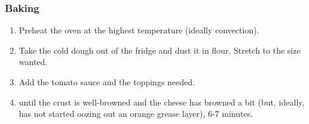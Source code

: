 \subsubsection{Baking}
\begin{enumerate}
    \item Preheat the oven at the highest temperature (ideally convection).
    \item Take the cold dough out of the fridge and dust it in flour. Stretch to the size wanted.
    \item Add the tomato sauce and the toppings needed.
    \item until the crust is well-browned and the cheese has browned a bit (but, ideally, has not started oozing out an orange grease layer), 6-7 minutes.
\end{enumerate}
